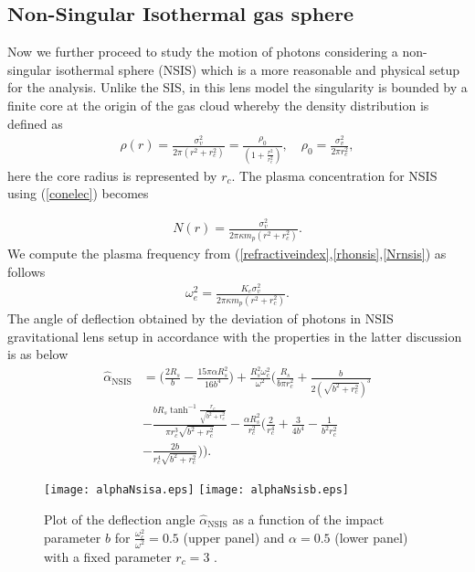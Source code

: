 \documentclass[final,5p,times,twocolumn,unknownkeysallowed]{elsarticle}
\begin{document}
\subsection{$\mathbf{Non}$-$\mathbf{Singular}$ $\mathbf{Isothermal}$ $\mathbf{gas}$ $\mathbf{sphere}$}
Now we further proceed to study the motion of photons considering a non-singular isothermal sphere (NSIS) which is a more reasonable and physical
setup for the analysis. Unlike the SIS, in this lens model the singularity is bounded by a finite core at the origin of the gas cloud whereby
the density distribution is defined as \cite{Hind:1987a,Wu:1996a}
\begin{align}
\rho(r)=\frac{\sigma^2_{v}}{2\pi (r^2+r^2_c)}=\frac{\rho_0}{(1+\frac{r^2}{r^2_c})}, \quad \rho_0=\frac{\sigma^2_{v}}{2\pi r^2_c}, \label{rhonsis}
\end{align}
here the core radius is represented by $r_c$. The plasma concentration for NSIS using (\ref{conelec}) becomes

\begin{align}
N(r)=\frac{\sigma^2_{v}}{2\pi \kappa m_p (r^2+r^2_c)}. \label{Nrnsis}
\end{align}
We compute the plasma frequency from (\ref{refractiveindex},\ref{rhonsis},\ref{Nrnsis}) as follows
\begin{align}
\omega^2_e=\frac{K_e\sigma^2_v}{2\pi\kappa m_p(r^2+r^2_c)}.
\end{align}
The angle of deflection obtained by the deviation of photons in NSIS gravitational lens setup in accordance with the properties in the latter discussion
is as below
\begin{align}
\hat{\alpha}_\mathrm{NSIS}&=\Bigg(\frac{2R_s}{b}-\frac{15\pi \alpha R^2_s}{16b^4}\Bigg)+\frac{R^2_s\omega^2_c}{\omega^2}\Bigg(\frac{R_s}{b\pi r^2_c}+
\frac{b}{2(\sqrt{b^2+r^2_c})^3}\nonumber\\&-\frac{bR_s\tanh^{-1}\frac{r_c}{\sqrt{b^2+r^2_c}}}{\pi r^3_c\sqrt{b^2+r^2_c}}
-\frac{\alpha R^2_s}{r^2_c}\Bigg(\frac{2}{r^4_c}+\frac{3}{4b^4}-\frac{1}{b^2r^2_c}\nonumber\\&-\frac{2b}{r^4_c\sqrt{b^2+r^2_c}}\Bigg)\Bigg).
\end{align}

\begin{figure}[h!]
 \begin{center}
   \texttt{[image: alphaNsisa.eps]}
   \texttt{[image: alphaNsisb.eps]}
  \end{center}
\caption{Plot of the deflection angle $\hat{\alpha}_\mathrm{NSIS}$ as a function of the impact
parameter $b$ for $\frac{\omega^2_{c}}{\omega^2}=0.5$
(upper panel) and $\alpha=0.5$ (lower panel) with a fixed parameter $r_c=3$ .}\label{angleNsis1}
\end{figure}
\end{document}
